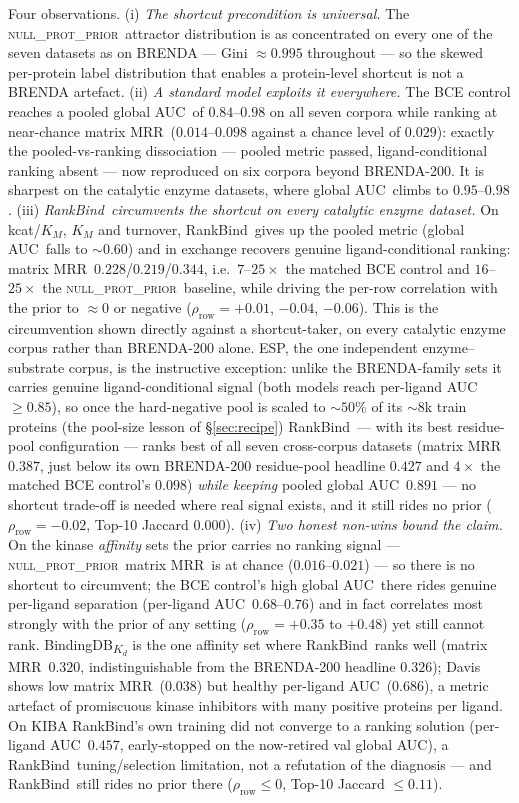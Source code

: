 \documentclass[11pt,a4paper]{article}
\newcommand{\method}{RankBind\xspace}
\newcommand{\nullprior}{\textsc{null\_prot\_prior}\xspace}
\newcommand{\gauc}{global AUC}
\newcommand{\plauc}{per-ligand AUC}
\newcommand{\matmrr}{matrix MRR}
\begin{document}
Four observations. (i) \emph{The shortcut precondition is universal.}
The \nullprior\ attractor distribution is as concentrated on every one
of the seven datasets as on BRENDA --- Gini $\approx 0.995$ throughout
--- so the skewed per-protein label distribution that enables a
protein-level shortcut is not a BRENDA artefact. (ii) \emph{A standard
model exploits it everywhere.} The BCE control reaches a pooled \gauc\
of $0.84$--$0.98$ on all seven corpora while ranking at near-chance
\matmrr\ ($0.014$--$0.098$ against a chance level of $0.029$): exactly
the pooled-vs-ranking dissociation --- pooled metric passed, ligand-conditional
ranking absent --- now reproduced on six corpora beyond BRENDA-200. It
is sharpest on the catalytic enzyme datasets, where \gauc\ climbs to
$0.95$--$0.98$. (iii) \emph{\method\ circumvents the shortcut on every
catalytic enzyme dataset.} On kcat/$K_M$, $K_M$ and turnover, \method\
gives up the pooled metric (\gauc\ falls to $\sim\!0.60$) and in
exchange recovers genuine ligand-conditional ranking: \matmrr\
$0.228$/$0.219$/$0.344$, i.e.\ $7$--$25\times$ the matched BCE control
and $16$--$25\times$ the \nullprior\ baseline, while driving the
per-row correlation with the prior to $\approx\!0$ or negative
($\rho_{\text{row}} = +0.01$, $-0.04$, $-0.06$). This is the
circumvention shown directly against a shortcut-taker, on every
catalytic enzyme corpus rather than BRENDA-200 alone. ESP, the one
independent enzyme--substrate corpus, is the instructive exception:
unlike the BRENDA-family sets it carries genuine ligand-conditional
signal (both models reach \plauc\ $\geq 0.85$), so once the hard-negative
pool is scaled to $\sim\!50\%$ of its $\sim\!8$k train proteins (the
pool-size lesson of \S\ref{sec:recipe}) \method\ --- with its best
residue-pool configuration --- ranks best of all seven cross-corpus
datasets (\matmrr\ $0.387$, just below its own BRENDA-200 residue-pool
headline $0.427$ and $4\times$ the matched BCE control's $0.098$)
\emph{while keeping} pooled
\gauc\ $0.891$ --- no shortcut trade-off is needed where real signal
exists, and it still rides no prior ($\rho_{\text{row}} = -0.02$, Top-10
Jaccard $0.000$). (iv) \emph{Two
honest non-wins bound the claim.} On the kinase \emph{affinity} sets the
prior carries no ranking signal --- \nullprior\ \matmrr\ is at chance
($0.016$--$0.021$) --- so there is no shortcut to circumvent; the BCE
control's high \gauc\ there rides genuine per-ligand separation
(\plauc\ $0.68$--$0.76$) and in fact correlates most strongly with the
prior of any setting ($\rho_{\text{row}} = +0.35$ to $+0.48$) yet still
cannot rank. BindingDB\textsubscript{$K_d$} is the one affinity set
where \method\ ranks well (\matmrr\ $0.320$, indistinguishable from the
BRENDA-200 headline $0.326$); Davis shows low \matmrr\ ($0.038$) but
healthy \plauc\ ($0.686$), a metric artefact of promiscuous kinase
inhibitors with many positive proteins per ligand. On KIBA
\method's own training did not converge to a ranking solution
(\plauc\ $0.457$, early-stopped on the now-retired val \gauc), a
\method\ tuning/selection limitation, not a refutation of the
diagnosis --- and \method\ still rides no prior there
($\rho_{\text{row}} \le 0$, Top-10 Jaccard $\le 0.11$).
\end{document}
